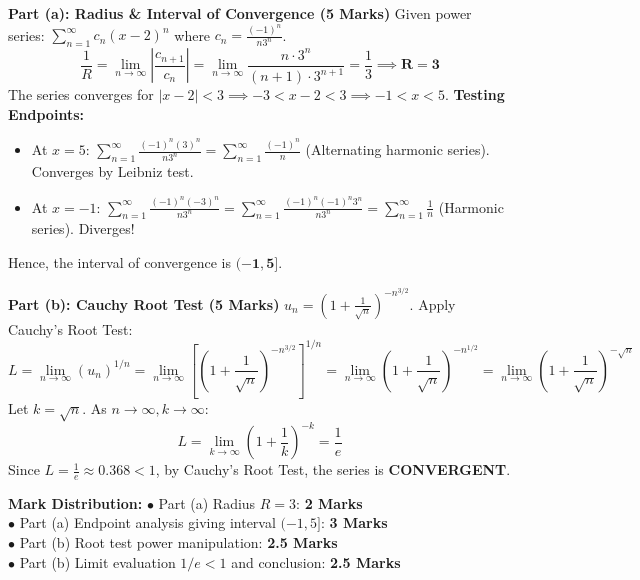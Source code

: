 \begin{solutionbox}
\textbf{Part (a): Radius \& Interval of Convergence (5 Marks)}
Given power series: $\sum_{n=1}^\infty c_n (x-2)^n$ where $c_n = \frac{(-1)^n}{n 3^n}$.
\[
\frac{1}{R} = \lim_{n\to\infty} \left|\frac{c_{n+1}}{c_n}\right| = \lim_{n\to\infty} \frac{n \cdot 3^n}{(n+1) \cdot 3^{n+1}} = \frac{1}{3} \implies \mathbf{R = 3}
\]
The series converges for $|x - 2| < 3 \implies -3 < x - 2 < 3 \implies -1 < x < 5$.
\textbf{Testing Endpoints:}
\begin{itemize}[leftmargin=6mm]
    \item At $x = 5$: $\sum_{n=1}^\infty \frac{(-1)^n (3)^n}{n 3^n} = \sum_{n=1}^\infty \frac{(-1)^n}{n}$ (Alternating harmonic series). Converges by Leibniz test.
    \item At $x = -1$: $\sum_{n=1}^\infty \frac{(-1)^n (-3)^n}{n 3^n} = \sum_{n=1}^\infty \frac{(-1)^n (-1)^n 3^n}{n 3^n} = \sum_{n=1}^\infty \frac{1}{n}$ (Harmonic series). Diverges!
\end{itemize}
Hence, the interval of convergence is $\mathbf{(-1, 5]}$.

\textbf{Part (b): Cauchy Root Test (5 Marks)}
$u_n = \left(1 + \frac{1}{\sqrt{n}}\right)^{-n^{3/2}}$.
Apply Cauchy's Root Test:
\[
L = \lim_{n\to\infty} (u_n)^{1/n} = \lim_{n\to\infty} \left[ \left(1 + \frac{1}{\sqrt{n}}\right)^{-n^{3/2}} \right]^{1/n} = \lim_{n\to\infty} \left(1 + \frac{1}{\sqrt{n}}\right)^{-n^{1/2}} = \lim_{n\to\infty} \left(1 + \frac{1}{\sqrt{n}}\right)^{-\sqrt{n}}
\]
Let $k = \sqrt{n}$. As $n \to \infty, k \to \infty$:
\[
L = \lim_{k\to\infty} \left(1 + \frac{1}{k}\right)^{-k} = \frac{1}{e}
\]
Since $L = \frac{1}{e} \approx 0.368 < 1$, by Cauchy's Root Test, the series is \textbf{CONVERGENT}.

\begin{markingrubric}
\textbf{Mark Distribution:}
$\bullet$ Part (a) Radius $R = 3$: \textbf{2 Marks}\\
$\bullet$ Part (a) Endpoint analysis giving interval $(-1, 5]$: \textbf{3 Marks}\\
$\bullet$ Part (b) Root test power manipulation: \textbf{2.5 Marks}\\
$\bullet$ Part (b) Limit evaluation $1/e < 1$ and conclusion: \textbf{2.5 Marks}
\end{markingrubric}
\end{solutionbox}

